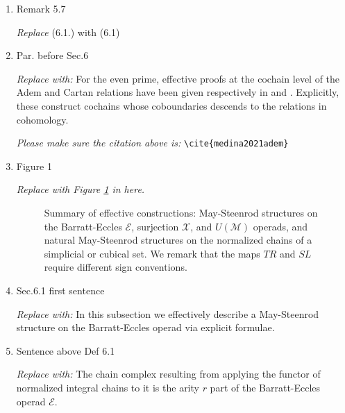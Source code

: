 \documentclass{amsart}
\theoremstyle{definition}
\newcommand{\End}{\mathrm{End}}
\begin{document}
\begin{enumerate}
\item Remark 5.7 \par
\textit{Replace} (6.1.) with (6.1)

\item Par. before Sec.6 \par
\textit{Replace with:}
For the even prime, effective proofs at the cochain level of the Adem and Cartan relations have been given respectively in \cite{medina2021adem} and \cite{medina2020cartan}.
Explicitly, these construct cochains whose coboundaries descends to the relations in cohomology.

\textit{Please make sure the citation above is:} \verb|\cite{medina2021adem}|

\item Figure 1 \par
\textit{Replace with Figure \ref{fig: bigsummary} in here.}
\begin{figure}[ht]
	\caption{Summary of effective constructions: May-Steenrod structures on the Barratt-Eccles $\mathcal E$, surjection $\mathcal X$, and $U(\mathcal M)$ operads, and natural May-Steenrod structures on the normalized chains of a simplicial or cubical set. We remark that the maps $TR$ and $SL$ require different sign conventions.}
	\label{fig: bigsummary}
\end{figure}

\item Sec.6.1 first sentence \par
\textit{Replace with:}
In this subsection we effectively describe a May-Steenrod structure on the Barratt-Eccles operad via explicit formulae.

\item Sentence above Def 6.1 \par
\textit{Replace with:}
The chain complex resulting from applying the functor of normalized integral chains to it is the arity $r$ part of the Barratt-Eccles operad $\mathcal E$.


\end{enumerate}
\end{document}
